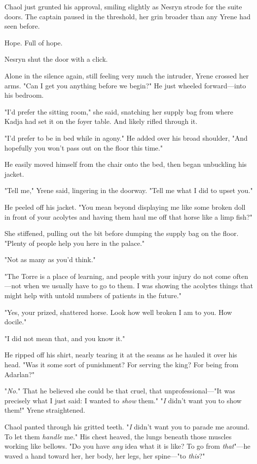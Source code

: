 Chaol just grunted his approval, smiling slightly as Nesryn strode for the suite doors.
The captain paused in the threshold, her grin broader than any Yrene had seen before.

Hope.
Full of hope.

Nesryn shut the door with a click.

Alone in the silence again, still feeling very much the intruder, Yrene crossed her arms.
"Can I get you anything before we begin?"
He just wheeled forward---into his bedroom.

"I'd prefer the sitting room," she said, snatching her supply bag from where Kadja had set it on the foyer table.
And likely rifled through it.

"I'd prefer to be in bed while in agony."
He added over his broad shoulder, "And hopefully you won't pass out on the floor this time."

He easily moved himself from the chair onto the bed, then began unbuckling his jacket.

"Tell me," Yrene said, lingering in the doorway.
"Tell me what I did to upset you."

He peeled off his jacket.
"You mean beyond displaying me like some broken doll in front of your acolytes and having them haul me off that horse like a limp fish?"

She stiffened, pulling out the bit before dumping the supply bag on the floor.
"Plenty of people help you here in the palace."

"Not as many as you'd think."

"The Torre is a place of learning, and people with your injury do not come often---not when we usually have to go to them.
I was showing the acolytes things that might help with untold numbers of patients in the future."

"Yes, your prized, shattered horse.
Look how well broken I am to you.
How docile."

"I did not mean that, and you know it."

He ripped off his shirt, nearly tearing it at the seams as he hauled it over his head.
"Was it some sort of punishment?
For serving the king?
For being from Adarlan?"

"\emph{No.}" That he believed she could be that cruel, that unprofessional---"It was precisely what I just said: I wanted to \emph{show} them."
"\emph{I} didn't want you to show them!"
Yrene straightened.

Chaol panted through his gritted teeth.
"\emph{I} didn't want you to parade me around.
To let them \emph{handle} me."
His chest heaved, the lungs beneath those muscles working like bellows.
"Do you have \emph{any} idea what it is like?
To go from \emph{that}"---he waved a hand toward her, her body, her legs, her spine---"to \emph{this}?"


